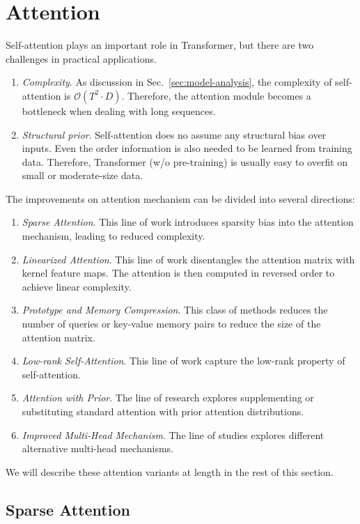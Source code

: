 \documentclass[manuscript,acmsmall,screen,nonacm]{acmart}
\theoremstyle{definition}
\begin{document}
\section{Attention}\label{sec:attention}

Self-attention plays an important role in Transformer, but there are two challenges in practical applications.

\begin{enumerate}
  \item \textit{Complexity}. As discussion in Sec.~\ref{sec:model-analysis}, the complexity of self-attention is $\mathcal O(T^2\cdot D)$. Therefore, the attention module becomes a bottleneck when dealing with long sequences.
  \item \textit{Structural prior}. Self-attention does no assume any structural bias over inputs. Even the order information is also needed to be learned from training data. Therefore, Transformer (w/o pre-training) is usually easy to overfit on small or moderate-size data.
\end{enumerate}

The improvements on attention mechanism can be divided into several directions:
\begin{enumerate}
  \item \textit{Sparse Attention}. This line of work introduces sparsity bias into the attention mechanism, leading to reduced complexity.
  \item \textit{Linearized Attention}. This line of work disentangles the attention matrix with kernel feature maps. The attention is then computed in reversed order to achieve linear complexity.
  \item \textit{Prototype and Memory Compression}. This class of methods reduces the number of queries or key-value memory pairs to reduce the size of the attention matrix.
  \item \textit{Low-rank Self-Attention}. This line of work capture the low-rank property of self-attention.
  \item \textit{Attention with Prior}. The line of research explores supplementing or substituting standard attention with prior attention distributions.
  \item \textit{Improved Multi-Head Mechanism}. The line of studies explores different alternative multi-head mechanisms.
\end{enumerate}
We will describe these attention variants at length in the rest of this section.

\subsection{Sparse Attention}\label{sec:sparseattn}
\end{document}
